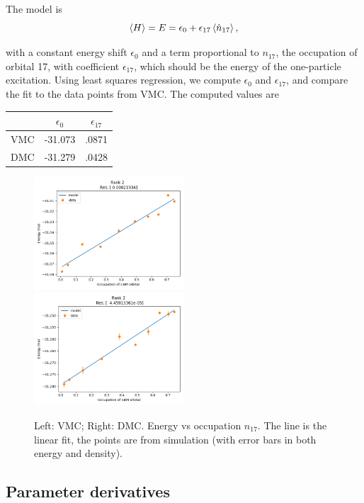 
The model is 
\begin{equation}
\left< H \right> = E = \epsilon_0 + \epsilon_{17} \left< \hat{n}_{17} \right>,
\label{eq:2orb_model}
\end{equation}

with a constant energy shift $\epsilon_0$ and a term proportional to $n_{17}$, the occupation of orbital 17, with coefficient $\epsilon_{17}$, which should be the energy of the one-particle excitation.
Using least squares regression, we compute $\epsilon_0$ and $\epsilon_{17}$, and compare the fit to the data points from VMC. 
The computed values are 

\begin{tabular}{c|cc}
 & $\epsilon_0$ & $\epsilon_{17}$ \\\hline
VMC & -31.073 & .0871 \\
DMC & -31.279 & .0428
\end{tabular}

\begin{figure}
\includegraphics[width=0.5\textwidth]{images/vmc_2orb_model.png}
\includegraphics[width=0.5\textwidth]{images/dmc_2orb_model.png}
\caption{
Left: VMC; Right: DMC. 
Energy vs occupation $n_{17}$. The line is the linear fit, the points are from simulation (with error bars in both energy and density).
}
\label{fig:2orb_model}
\end{figure}

\subsection{Parameter derivatives}


